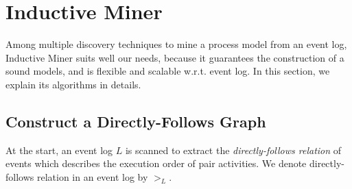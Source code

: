 \section{Inductive Miner}
Among multiple discovery techniques to mine a process model from an event log, Inductive Miner suits well our needs, because it guarantees the construction of a sound models, and is flexible and scalable w.r.t. event log. In this section, we explain its algorithms in details.
\subsection{Construct a Directly-Follows Graph}
At the start, an event log $L$ is scanned to extract the \emph{directly-follows relation} of events which describes the execution order of pair activities. We denote directly-follows relation in an event log by $>_L$. 
  
